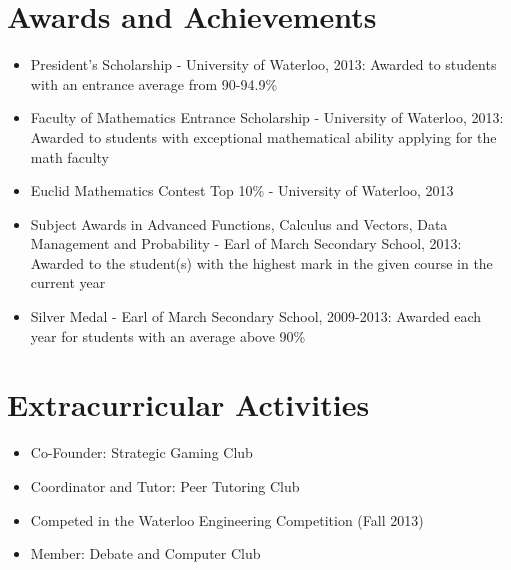 \documentclass[12pt]{article}
\begin{document}
\section*{Awards and Achievements}
	\begin{itemize} \vspace{-12pt}
	\item President's Scholarship - University of Waterloo, 2013: Awarded to students with an entrance average from 90-94.9\%
	\item Faculty of Mathematics Entrance Scholarship - University of Waterloo, 2013: Awarded to students with exceptional mathematical ability applying for the math faculty
	\item Euclid Mathematics Contest Top 10\% - University of Waterloo, 2013	
	\item Subject Awards in Advanced Functions, Calculus and Vectors, Data Management and Probability - Earl of March Secondary School, 2013: Awarded to the student(s) with the highest mark in the given course in the current year
	\item Silver Medal - Earl of March Secondary School, 2009-2013: Awarded each year for students with an average above 90\%
	\end{itemize}
	
\section*{Extracurricular Activities}
	\begin{itemize} \vspace*{-12pt}
	\item Co-Founder: Strategic Gaming Club
	\item Coordinator and Tutor: Peer Tutoring Club
	\item Competed in the Waterloo Engineering Competition (Fall 2013)
	\item Member: Debate and Computer Club 
	\end{itemize} 
	
\end{document}
